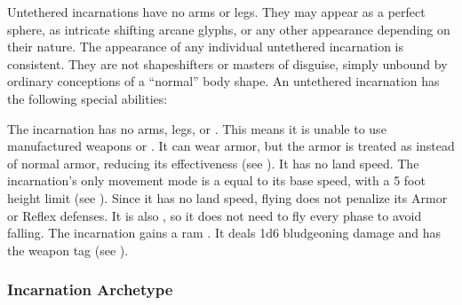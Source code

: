         Untethered incarnations have no arms or legs.
        They may appear as a perfect sphere, as intricate shifting arcane glyphs, or any other appearance depending on their nature.
        The appearance of any individual untethered incarnation is consistent.
        They are not shapeshifters or masters of disguise, simply unbound by ordinary conceptions of a ``normal'' body shape.
        An untethered incarnation has the following special abilities:
        \begin{raggeditemize}
             The incarnation has no arms, legs, or .
                This means it is unable to use manufactured weapons or .
                It can wear armor, but the armor is treated as  instead of normal armor, reducing its effectiveness (see ).
                It has no land speed.
             The incarnation's only movement mode is a  equal to its base speed, with a 5 foot height limit (see ).
                Since it has no land speed, flying does not penalize its Armor or Reflex defenses.
                It is also , so it does not need to fly every phase to avoid falling.
             The incarnation gains a ram .
                It deals 1d6 bludgeoning damage and has the  weapon tag (see ).
        \end{raggeditemize}

        \subsubsection{Incarnation Archetype}

